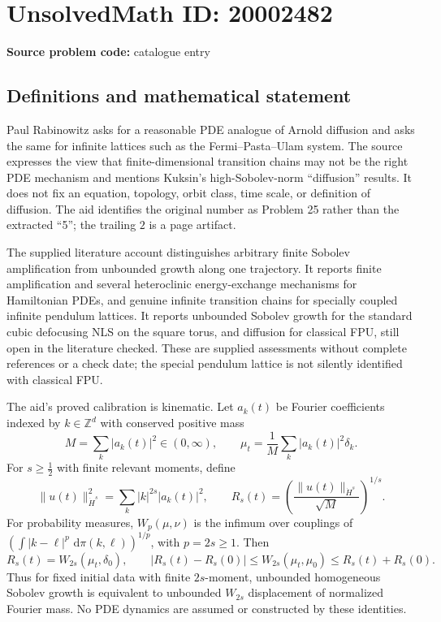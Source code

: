 \documentclass[11pt]{article}
\newcommand{\Z}{\mathbb{Z}}
\newcommand{\dd}{\,\mathrm{d}}
\begin{document}
\section*{UnsolvedMath ID: 20002482}
\textbf{Source problem code:} catalogue entry
\subsection{Definitions and mathematical statement}
Paul Rabinowitz asks for a reasonable PDE analogue of Arnold diffusion and asks the same for infinite lattices such as the Fermi--Pasta--Ulam system. The source expresses the view that finite-dimensional transition chains may not be the right PDE mechanism and mentions Kuksin's high-Sobolev-norm ``diffusion'' results. It does not fix an equation, topology, orbit class, time scale, or definition of diffusion. The aid identifies the original number as Problem 25 rather than the extracted ``5''; the trailing $2$ is a page artifact.

The supplied literature account distinguishes arbitrary finite Sobolev amplification from unbounded growth along one trajectory. It reports finite amplification and several heteroclinic energy-exchange mechanisms for Hamiltonian PDEs, and genuine infinite transition chains for specially coupled infinite pendulum lattices. It reports unbounded Sobolev growth for the standard cubic defocusing NLS on the square torus, and diffusion for classical FPU, still open in the literature checked. These are supplied assessments without complete references or a check date; the special pendulum lattice is not silently identified with classical FPU.

The aid's proved calibration is kinematic. Let $a_k(t)$ be Fourier coefficients indexed by $k\in\Z^d$ with conserved positive mass
\[
M=\sum_k|a_k(t)|^2\in(0,\infty),\qquad
\mu_t=\frac1M\sum_k|a_k(t)|^2\delta_k.
\]
For $s\geq\tfrac12$ with finite relevant moments, define
\[
\|u(t)\|_{\dot H^s}^2=\sum_k|k|^{2s}|a_k(t)|^2,\qquad
R_s(t)=\left(\frac{\|u(t)\|_{\dot H^s}}{\sqrt M}\right)^{1/s}.
\]
For probability measures, $W_p(\mu,\nu)$ is the infimum over couplings of $(\int|k-\ell|^p\,\dd\pi(k,\ell))^{1/p}$, with $p=2s\geq1$. Then
\[
R_s(t)=W_{2s}(\mu_t,\delta_0),\qquad
|R_s(t)-R_s(0)|\leq W_{2s}(\mu_t,\mu_0)\leq R_s(t)+R_s(0).
\]
Thus for fixed initial data with finite $2s$-moment, unbounded homogeneous Sobolev growth is equivalent to unbounded $W_{2s}$ displacement of normalized Fourier mass. No PDE dynamics are assumed or constructed by these identities.
\end{document}
